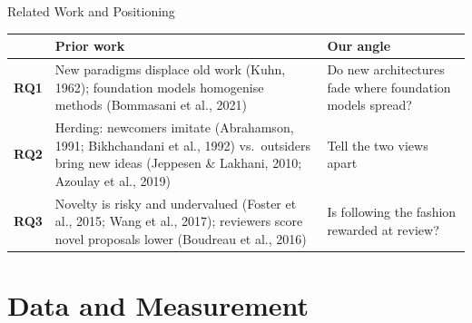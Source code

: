 \documentclass[aspectratio=169,11pt]{beamer}
\newcommand{\rc}[1]{{\color{note}\footnotesize(#1)}}
\begin{document}
\begin{frame}{Related Work and Positioning}
  \begin{table}
    \centering\small\renewcommand{\arraystretch}{1.15}
    \begin{tabularx}{\textwidth}{@{}l >{\raggedright\arraybackslash}X >{\raggedright\arraybackslash}p{}@{}}
      \toprule
      & Prior work & Our angle \\
      \midrule
      \textbf{RQ1} & New paradigms displace old work \rc{Kuhn, 1962}; foundation models homogenise methods
        \rc{Bommasani et al., 2021} & Do new architectures fade where foundation models spread? \\
      \textbf{RQ2} & Herding: newcomers imitate \rc{Abrahamson, 1991; Bikhchandani et al., 1992} vs.\ outsiders bring
        new ideas \rc{Jeppesen \& Lakhani, 2010; Azoulay et al., 2019} & Tell the two views apart \\
      \textbf{RQ3} & Novelty is risky and undervalued \rc{Foster et al., 2015; Wang et al., 2017}; reviewers score novel
        proposals lower \rc{Boudreau et al., 2016} & Is following the fashion rewarded at review? \\
      \bottomrule
    \end{tabularx}
  \end{table}
\end{frame}

\section{Data and Measurement}
\end{document}

